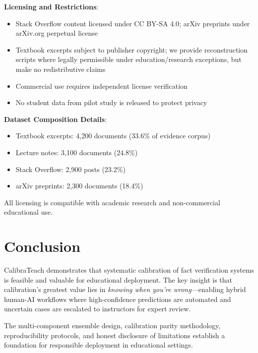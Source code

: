 \documentclass[journal]{IEEEtran}
\begin{document}
\textbf{Licensing and Restrictions}:
\begin{itemize}
    \item Stack Overflow content licensed under CC BY-SA 4.0; arXiv preprints under arXiv.org perpetual license
    \item Textbook excerpts subject to publisher copyright; we provide reconstruction scripts where legally permissible under education/research exceptions, but make no redistributive claims
    \item Commercial use requires independent license verification
    \item No student data from pilot study is released to protect privacy
\end{itemize}

\textbf{Dataset Composition Details}:
\begin{itemize}
    \item Textbook excerpts: 4,200 documents (33.6\% of evidence corpus)
    \item Lecture notes: 3,100 documents (24.8\%)
    \item Stack Overflow: 2,900 posts (23.2\%)
    \item arXiv preprints: 2,300 documents (18.4\%)
\end{itemize}

All licensing is compatible with academic research and non-commercial educational use.


\section{Conclusion}

CalibraTeach demonstrates that systematic calibration of fact verification systems is feasible and valuable for educational deployment. The key insight is that calibration's greatest value lies in \textit{knowing when you're wrong}---enabling hybrid human-AI workflows where high-confidence predictions are automated and uncertain cases are escalated to instructors for expert review.

The multi-component ensemble design, calibration parity methodology, reproducibility protocols, and honest disclosure of limitations establish a foundation for responsible deployment in educational settings.
\end{document}
